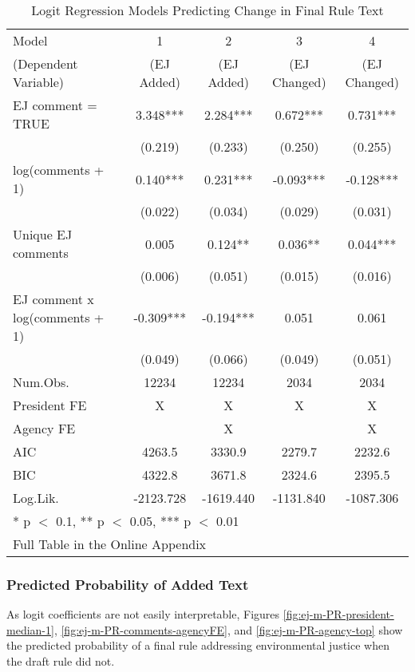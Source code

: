 \documentclass[
      12pt,
        ]{article}
\begin{document}
\begin{table}[H]
\centering
\caption{\label{tab:tables}Logit Regression Models Predicting Change in Final Rule Text}

\begin{tabular}[t]{lcccc}
\toprule
Model  & 1 & 2 & 3 & 4\\
(Dependent Variable)  & (EJ Added) & (EJ Added) & (EJ Changed) & (EJ Changed)\\
\midrule
EJ comment = TRUE & 3.348*** & 2.284*** & 0.672*** & 0.731***\\
 & (0.219) & (0.233) & (0.250) & (0.255)\\
log(comments + 1) & 0.140*** & 0.231*** & -0.093*** & -0.128***\\
 & (0.022) & (0.034) & (0.029) & (0.031)\\
Unique EJ comments & 0.005 & 0.124** & 0.036** & 0.044***\\
 & (0.006) & (0.051) & (0.015) & (0.016)\\
EJ comment x log(comments + 1) & -0.309*** & -0.194*** & 0.051 & 0.061\\
 & (0.049) & (0.066) & (0.049) & (0.051)\\
\midrule
Num.Obs. & 12234 & 12234 & 2034 & 2034\\
President FE & X & X & X & X\\
Agency FE &  & X &  & X\\
AIC & 4263.5 & 3330.9 & 2279.7 & 2232.6\\
BIC & 4322.8 & 3671.8 & 2324.6 & 2395.5\\
Log.Lik. & -2123.728 & -1619.440 & -1131.840 & -1087.306\\
\bottomrule
\multicolumn{5}{l}{\textsuperscript{} * p $<$ 0.1, ** p $<$ 0.05, *** p $<$ 0.01}\\
\multicolumn{5}{l}{\textsuperscript{} Full Table in the Online Appendix}\\
\end{tabular}
\end{table}

\hypertarget{predicted-probability-of-added-text}{%
\subsubsection{Predicted Probability of Added Text}\label{predicted-probability-of-added-text}}

As logit coefficients are not easily interpretable, Figures \ref{fig:ej-m-PR-president-median-1}, \ref{fig:ej-m-PR-comments-agencyFE}, and \ref{fig:ej-m-PR-agency-top} show the predicted probability of a final rule addressing environmental justice when the draft rule did not.
\end{document}
